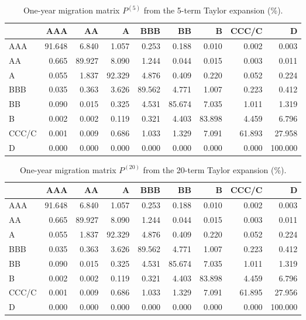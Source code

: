 \documentclass[
  11pt,
]{article}
\begin{document}
\begin{longtable}[t]{lrrrrrrrr}
\caption{\label{tab:task1-P5-table}One-year migration matrix $P^{(5)}$ from the 5-term Taylor expansion (\%).}\\
\toprule
 & AAA & AA & A & BBB & BB & B & CCC/C & D\\
\midrule
AAA & 91.648 & 6.840 & 1.057 & 0.253 & 0.188 & 0.010 & 0.002 & 0.003\\
AA & 0.665 & 89.927 & 8.090 & 1.244 & 0.044 & 0.015 & 0.003 & 0.011\\
A & 0.055 & 1.837 & 92.329 & 4.876 & 0.409 & 0.220 & 0.052 & 0.224\\
BBB & 0.035 & 0.363 & 3.626 & 89.562 & 4.771 & 1.007 & 0.223 & 0.412\\
BB & 0.090 & 0.015 & 0.325 & 4.531 & 85.674 & 7.035 & 1.011 & 1.319\\
\addlinespace
B & 0.002 & 0.002 & 0.119 & 0.321 & 4.403 & 83.898 & 4.459 & 6.796\\
CCC/C & 0.001 & 0.009 & 0.686 & 1.033 & 1.329 & 7.091 & 61.893 & 27.958\\
D & 0.000 & 0.000 & 0.000 & 0.000 & 0.000 & 0.000 & 0.000 & 100.000\\
\bottomrule
\end{longtable}

\begin{longtable}[t]{lrrrrrrrr}
\caption{\label{tab:task1-P20-table}One-year migration matrix $P^{(20)}$ from the 20-term Taylor expansion (\%).}\\
\toprule
 & AAA & AA & A & BBB & BB & B & CCC/C & D\\
\midrule
AAA & 91.648 & 6.840 & 1.057 & 0.253 & 0.188 & 0.010 & 0.002 & 0.003\\
AA & 0.665 & 89.927 & 8.090 & 1.244 & 0.044 & 0.015 & 0.003 & 0.011\\
A & 0.055 & 1.837 & 92.329 & 4.876 & 0.409 & 0.220 & 0.052 & 0.224\\
BBB & 0.035 & 0.363 & 3.626 & 89.562 & 4.771 & 1.007 & 0.223 & 0.412\\
BB & 0.090 & 0.015 & 0.325 & 4.531 & 85.674 & 7.035 & 1.011 & 1.319\\
\addlinespace
B & 0.002 & 0.002 & 0.119 & 0.321 & 4.403 & 83.898 & 4.459 & 6.796\\
CCC/C & 0.001 & 0.009 & 0.686 & 1.033 & 1.329 & 7.091 & 61.895 & 27.956\\
D & 0.000 & 0.000 & 0.000 & 0.000 & 0.000 & 0.000 & 0.000 & 100.000\\
\bottomrule
\end{longtable}
\end{document}

